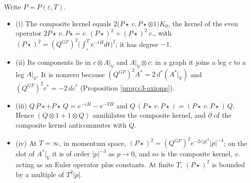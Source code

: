 \begin{proposition}
\label{prop:c9-composite}
Write $P=P(\varepsilon,T)$.
\begin{itemize}
\item (i) The composite kernel equals $2\big(P\star\,v.\,P\star\otimes1\big)K_0$, the kernel of the even operator $2P\star\,v.\,P\star=v.\,(P\star)^2+(P\star)^2\,v.$, with $(P\star)^2=(Q^{GF})^2\big(\int_\varepsilon^Te^{-tH}dt\big)^2$; it has degree $-1$.
\item (ii) Its components lie in $c\otimes A|_V$ and $A|_V\otimes c$: in a graph it joins a leg $c$ to a leg $A|_V$. It is nonzero because $(Q^{GF})^2A^*=2\,d^*(A^*|_V)$ and $(Q^{GF})^2c^*=-2\,dc^*$ (Proposition \ref{prop:c3-axioms}).
\item (iii) $Q\,P\star+P\star\,Q=e^{-\varepsilon H}-e^{-TH}$ and $Q\,(P\star\,v.\,P\star)=(P\star\,v.\,P\star)\,Q$. Hence $(Q\otimes1+1\otimes Q)$ annihilates the composite kernel, and $\partial$ of the composite kernel anticommutes with $Q$.
\item (iv) At $T=\infty$, in momentum space, $(P\star)^2=(Q^{GF})^2e^{-2\varepsilon|p|^2}|p|^{-4}$; on the slot of $A^*|_V$ it is of order $|p|^{-3}$ as $p\to0$, and so is the composite kernel, $v.$ acting as an Euler operator plus constants. At finite $T$, $(P\star)^2$ is bounded by a multiple of $T^2|p|$.
\end{itemize}
\end{proposition}

